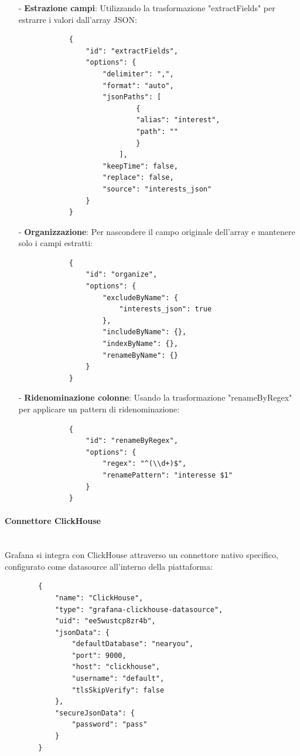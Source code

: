 \documentclass[10pt]{article}
\newcommand{\myparagraph}[1]{\paragraph{#1}\mbox{}\\}
\begin{document}
        \begin{itemize}
            \item[-] \textbf{Estrazione campi}: Utilizzando la trasformazione "extractFields" per estrarre i valori dall'array JSON:
            \begin{lstlisting}
            {
                "id": "extractFields",
                "options": {
                    "delimiter": ",",
                    "format": "auto",
                    "jsonPaths": [
                            {
                            "alias": "interest",
                            "path": ""
                            }
                        ],
                    "keepTime": false,
                    "replace": false,
                    "source": "interests_json"
                }
            }
            \end{lstlisting}
            
            \item[-] \textbf{Organizzazione}: Per nascondere il campo originale dell'array e mantenere solo i campi estratti:
            \begin{lstlisting}
            {
                "id": "organize",
                "options": {
                    "excludeByName": {
                        "interests_json": true
                    },
                    "includeByName": {},
                    "indexByName": {},
                    "renameByName": {}
                }
            }
            \end{lstlisting}
            
            \item[-] \textbf{Ridenominazione colonne}: Usando la trasformazione "renameByRegex" per applicare un pattern di ridenominazione:
            \begin{lstlisting}
            {
                "id": "renameByRegex",
                "options": {
                    "regex": "^(\\d+)$",
                    "renamePattern": "interesse $1"
                }
            }
            \end{lstlisting}
        \end{itemize}


        \myparagraph{Connettore ClickHouse}
        Grafana si integra con ClickHouse attraverso un connettore nativo specifico, configurato come datasource all'interno della piattaforma:
        
        \begin{lstlisting}
        {
            "name": "ClickHouse",
            "type": "grafana-clickhouse-datasource",
            "uid": "ee5wustcp8zr4b",
            "jsonData": {
                "defaultDatabase": "nearyou",
                "port": 9000,
                "host": "clickhouse",
                "username": "default",
                "tlsSkipVerify": false
            },
            "secureJsonData": {
                "password": "pass"
            }
        }
        \end{lstlisting}
        
\end{document}
